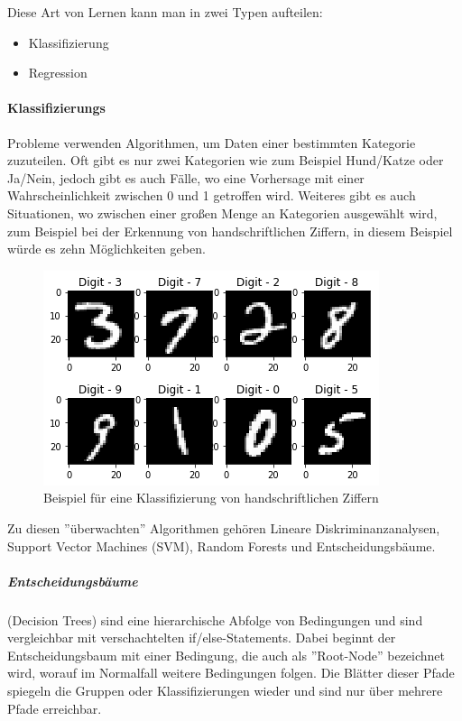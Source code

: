 Diese Art von Lernen kann man in zwei Typen aufteilen:

\begin{itemize}
      \item Klassifizierung
      \item Regression
\end{itemize}

\paragraph{Klassifizierungs} Probleme verwenden Algorithmen, um Daten einer bestimmten Kategorie zuzuteilen. Oft gibt es nur zwei Kategorien wie zum Beispiel Hund/Katze oder Ja/Nein, jedoch gibt es auch Fälle, wo eine Vorhersage mit einer Wahrscheinlichkeit zwischen 0 und 1 getroffen wird. Weiteres gibt es auch Situationen, wo zwischen einer großen Menge an Kategorien ausgewählt wird, zum Beispiel bei der Erkennung von handschriftlichen Ziffern, in diesem Beispiel würde es zehn Möglichkeiten geben.

\begin{figure}[H]
      \centering
      \includegraphics{sections/machine-learning/images/0_8-vKSQnZvKbtKXKy.png}
      \caption{Beispiel für eine Klassifizierung von handschriftlichen Ziffern}
      \label{ziffern}
\end{figure}

Zu diesen ''überwachten'' Algorithmen gehören Lineare Diskriminanzanalysen, Support Vector Machines (SVM), Random Forests und Entscheidungsbäume. \cite{SL:online}

\subparagraph{Entscheidungsbäume} (Decision Trees) sind eine hierarchische Abfolge von Bedingungen und sind vergleichbar mit verschachtelten if/else-Statements. Dabei beginnt der Entscheidungsbaum mit einer Bedingung, die auch als ''Root-Node'' bezeichnet wird, worauf im Normalfall weitere Bedingungen folgen. Die Blätter dieser Pfade spiegeln die Gruppen oder Klassifizierungen wieder und sind nur über mehrere Pfade erreichbar.

